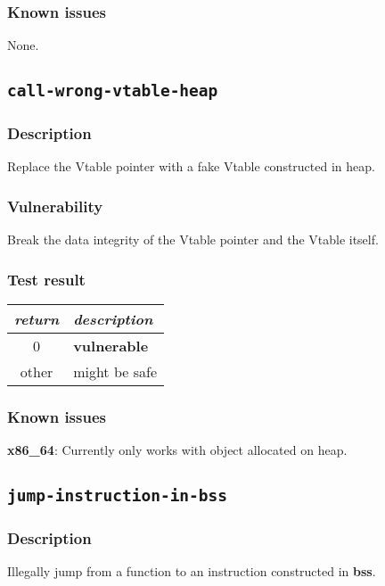 \documentclass[a4paper]{book}
\begin{document}
\subsubsection{Known issues}
None.

\newpage

\subsection{\texttt{call-wrong-vtable-heap}}\label{test-call-wrong-vtable-heap}

\subsubsection{Description}
Replace the Vtable pointer with a fake Vtable constructed in heap.

\subsubsection{Vulnerability}
Break the data integrity of the Vtable pointer and the Vtable itself.

\subsubsection{Test result}
\begin{tabular}{cl}
  \toprule
  \emph{return}  & \emph{description} \\
  \midrule
  0              & \textbf{vulnerable} \\
  other          & might be safe \\
  \bottomrule
\end{tabular}

\subsubsection{Known issues}

\textbf{x86\_64}: Currently only works with object allocated on heap.
\newpage
\subsection{\texttt{jump-instruction-in-bss}}\label{test-jump-instruction-in-bss}

\subsubsection{Description}
Illegally jump from a function to an instruction constructed in \textbf{bss}.
\end{document}
